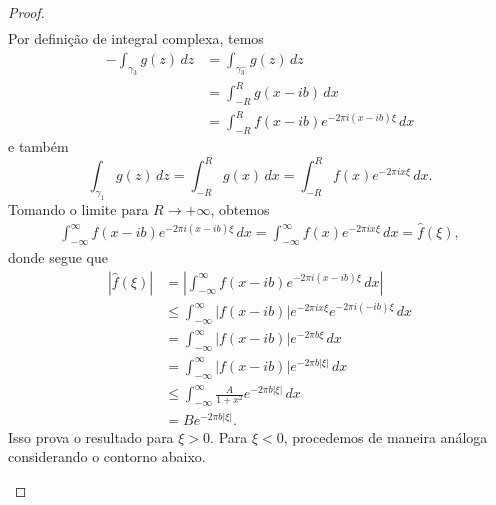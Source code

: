 \begin{proof}
\begin{align*}
            \end{align*}
            Por definição de integral complexa, temos
            \begin{align*}
                -\int_{\gamma_3} g(z) \, dz &= \int_{\gamma_3^-} g(z) \, dz \\
                                            &= \int_{-R}^R g(x-ib) \, dx \\
                                            &= \int_{-R}^R f(x-ib)e^{-2\pi i(x-ib)\xi} \, dx
            \end{align*}
            e também
            \begin{equation*}
                \int_{\gamma_1} g(z) \, dz = \int_{-R}^R g(x) \, dx = \int_{-R}^R f(x)e^{-2\pi ix\xi} \, dx.
            \end{equation*}
            Tomando o limite para $R\to +\infty$, obtemos
            \begin{align*}
                \int_{-\infty}^{\infty} f(x-ib)e^{-2\pi i(x-ib)\xi} \, dx
                =
                \int_{-\infty}^{\infty} f(x)e^{-2\pi ix\xi} \, dx
                =
                \widehat{f}(\xi),
            \end{align*}
            donde segue que
            \begin{align*}
                |\widehat{f}(\xi)| &=\left|\int_{-\infty}^{\infty} f(x-ib)e^{-2\pi i(x-ib)\xi} \, dx\right| \\
                                   &\leq\int_{-\infty}^{\infty}|f(x-ib)|e^{-2\pi ix\xi}e^{-2\pi i(-ib)\xi}\,dx \\
                                   &= \int_{-\infty}^{\infty}|f(x-ib)|e^{-2\pi b\xi} \,dx \\
                                   &= \int_{-\infty}^{\infty}|f(x-ib)|e^{-2\pi b|\xi|} \,dx \\
                                   &\leq \int_{-\infty}^{\infty} \frac{A}{1+x^2}e^{-2\pi b|\xi|} \, dx \\
                                   &= Be^{-2\pi b|\xi|}.
            \end{align*}
            Isso prova o resultado para $\xi > 0$. Para $\xi < 0$, procedemos de maneira análoga considerando
            o contorno abaixo.
            \begin{figure}[H]
				\centering 
				\begin{tikzpicture}

\end{tikzpicture}
\end{figure}
\end{proof}

